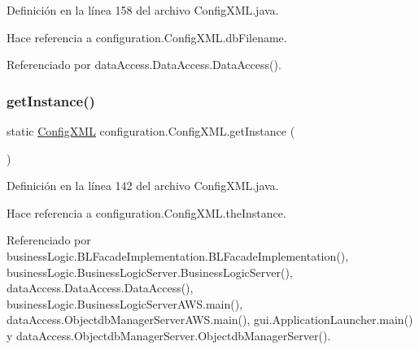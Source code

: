 Definición en la línea 158 del archivo Config\+X\+M\+L.\+java.


\begin{DoxyCode}{0}

\end{DoxyCode}


Hace referencia a configuration.\+Config\+X\+M\+L.\+db\+Filename.



Referenciado por data\+Access.\+Data\+Access.\+Data\+Access().

\mbox{\label{classconfiguration_1_1ConfigXML_a74c5e0c09c0139554ede8d786cb808ff}} 
\subsubsection{\texorpdfstring{getInstance()}{getInstance()}}
{\footnotesize\ttfamily static \mbox{\hyperlink{classconfiguration_1_1ConfigXML}{Config\+X\+ML}} configuration.\+Config\+X\+M\+L.\+get\+Instance (\begin{DoxyParamCaption}{ }\end{DoxyParamCaption})\hspace{0.3cm}{\ttfamily [static]}}



Definición en la línea 142 del archivo Config\+X\+M\+L.\+java.


\begin{DoxyCode}{0}

\end{DoxyCode}


Hace referencia a configuration.\+Config\+X\+M\+L.\+the\+Instance.



Referenciado por business\+Logic.\+B\+L\+Facade\+Implementation.\+B\+L\+Facade\+Implementation(), business\+Logic.\+Business\+Logic\+Server.\+Business\+Logic\+Server(), data\+Access.\+Data\+Access.\+Data\+Access(), business\+Logic.\+Business\+Logic\+Server\+A\+W\+S.\+main(), data\+Access.\+Objectdb\+Manager\+Server\+A\+W\+S.\+main(), gui.\+Application\+Launcher.\+main() y data\+Access.\+Objectdb\+Manager\+Server.\+Objectdb\+Manager\+Server().

